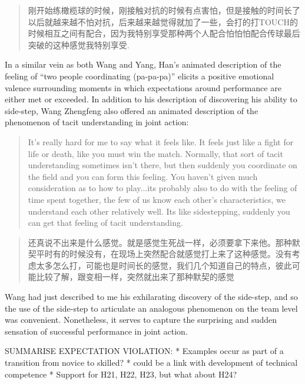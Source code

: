 \begin{CJK}{UTF8}{gbsn}
\begin{quote}
      刚开始练橄榄球的时候，刚接触对抗的时候有点害怕，但是接触的时间长了以后就越来越不怕对抗，后来越来越觉得就加了一些，会打的打TOUCH的时候相互之间有配合，因为我特别享受那种两个人配合怕怕怕配合传球最后突破的这种感觉我特别享受.
\end{quote}

In a similar vein as both Wang and Yang, Han's animated description of the feeling of ``two people coordinating (pa-pa-pa)'' elicits a positive emotional valence surrounding moments in which expectations around performance are either met or exceeded.  In addition to his description of discovering his ability to side-step, Wang Zhengfeng also offered an animated description of the phenomenon of tacit understanding in joint action:

  \begin{quote}
    It’s really hard for me to say what it feels like.  It feels just like a fight for life or death, like you must win the match.  Normally, that sort of tacit understanding sometimes isn’t there, but then suddenly you coordinate on the field and you can form this feeling.  You haven't given much consideration as to how to play...its probably also to do with the feeling of time spent together, the few of us know each other’s characteristics, we understand each other relatively well.  Its like sidestepping, suddenly you can get that feeling of tacit understanding.
  \end{quote}

  \begin{quote}
    还真说不出来是什么感觉。就是感觉生死战一样，必须要拿下来他。那种默契平时有的时候没有，在现场上突然配合就感觉打上来了这种感觉。没有考虑太多怎么打，可能也是时间长的感觉，我们几个知道自己的特点，彼此可能比较了解，跟变相一样，突然就出来了那种默契的感觉
  \end{quote}

Wang had just described to me his exhilarating discovery of the side-step, and so the use of the side-step to articulate an analogous phenomenon on the team level was convenient.  Nonetheless, it serves to capture the surprising and sudden sensation of successful performance in joint action.


SUMMARISE EXPECTATION VIOLATION:
* Examples occur as part of a transition from novice to skilled?
    * could be a link with development of technical competence
    * Support for H21, H22, H23, but what about H24?



















\end{CJK}
